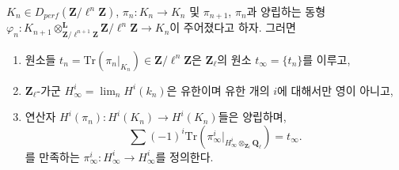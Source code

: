 \begin{lemma}
\label{lemma-piece-together}
$K_n\in D_{perf}(\mathbf{Z}/\ell^n\mathbf{Z})$,
$\pi_n : K_n\to K_n$ 및 $\pi_{n+1}$, $\pi_n$과 양립하는 동형
$\varphi_n :
K_{n+1} \otimes^\mathbf{L}_{\mathbf{Z}/\ell^{n+1}\mathbf{Z}}
\mathbf{Z}/\ell^n\mathbf{Z}
\to K_n$이 주어졌다고 하자. 그러면
\begin{enumerate}
\item
원소들 $t_n = \text{Tr}(\pi_n |_{K_n})\in
\mathbf{Z}/\ell^n\mathbf{Z}$은 $\mathbf{Z}_\ell$의 원소
$t_\infty = \{t_n\}$를 이루고,
\item
$\mathbf{Z}_\ell$-가군 $H_\infty^i = \lim_n H^i(k_n)$은 유한이며
유한 개의 $i$에 대해서만 영이 아니고,
\item
연산자 $H^i(\pi_n): H^i(K_n)\to H^i(K_n)$들은 양립하며,
$$
\sum (-1)^i \text{Tr}(
\pi_\infty^i |_{H_\infty^i \otimes_{\mathbf{Z}_\ell}\mathbf{Q}_\ell}) =
t_\infty.
$$
를 만족하는 $\pi_\infty^i : H_\infty^i\to H_\infty^i$를 정의한다.
\end{enumerate}
\end{lemma}

